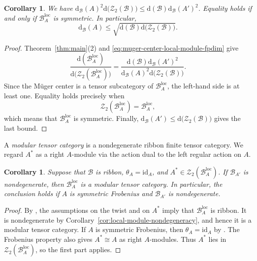 \documentclass[11pt,reqno]{amsart}
\numberwithin{equation}{section}
\theoremstyle{plain}
\newtheorem{corollary}[thmctr]{Corollary}
\theoremstyle{definition}
\theoremstyle{remark}
\newcommand{\B}{\mathcal{B}}
\newcommand{\Z}{\mathcal{Z}}
\newcommand{\loc}{\mathrm{loc}}
\newcommand{\FP}{\mathrm{d}}
\newcommand{\id}{\mathrm{id}}
\begin{document}
\begin{corollary}\label{cor:local-module-sharp-dimension-bound}
We have $\FP_{\B}(A)^2\FP\bigl(\Z_2(\B)\bigr) \leq \FP(\B)\FP_{\B}(A')^2$.
Equality holds if and only if $\B_A^{\loc}$ is symmetric.
In particular,
\[
  \FP_{\B}(A)
  \leq
  \sqrt{\FP(\B)\FP\bigl(\Z_2(\B)\bigr)}.
\]
\end{corollary}

\begin{proof}
Theorem~\ref{thm:main}(2) and
\eqref{eq:muger-center-local-module-fpdim} give
\[
  \frac{
    \FP(\B_A^{\loc})
  }{
    \FP\bigl(\Z_2(\B_A^{\loc})\bigr)
  }
  =
  \frac{
    \FP(\B)\FP_{\B}(A')^2
  }{
    \FP_{\B}(A)^2\FP\bigl(\Z_2(\B)\bigr)
  }.
\]
Since the M\"uger center is a tensor subcategory of $\B_A^{\loc}$, the
left-hand side is at least one. Equality holds precisely when
\[
  \Z_2(\B_A^{\loc})=\B_A^{\loc},
\]
which means that $\B_A^{\loc}$ is symmetric. Finally,
$\FP_{\B}(A')\leq\FP\bigl(\Z_2(\B)\bigr)$ gives the last bound.
\end{proof}

A \emph{modular tensor category} is a nondegenerate ribbon finite tensor
category. We regard $A^*$ as a right $A$-module via the action dual to the
left regular action on $A$.
\begin{corollary}\label{cor:local-module-modularity}
Suppose that $\B$ is ribbon, $\theta_A=\id_A$, and
$A^*\in\Z_2(\B_A^{\loc})$. If $\B_{A'}$ is nondegenerate, then
$\B_A^{\loc}$ is a modular tensor category. 
In particular, the conclusion holds if $A$ is symmetric Frobenius and
$\B_{A'}$ is nondegenerate.
\end{corollary}
\begin{proof}
By \cite[Theorem~5.21(b)]{shimizu2026commutative}, the assumptions on the
twist and on $A^*$ imply that $\B_A^{\loc}$ is ribbon. It is nondegenerate by
Corollary~\ref{cor:local-module-nondegeneracy}, and hence it is a modular
tensor category. If $A$ is symmetric Frobenius, then $\theta_A=\id_A$ by
\cite[Lemma~2.6]{shimizu2026commutative}. The Frobenius property also gives
$A^*\cong A$ as right $A$-modules. Thus $A^*$ lies in
$\Z_2(\B_A^\loc)$, so the first part applies.
\end{proof}




\end{document}
